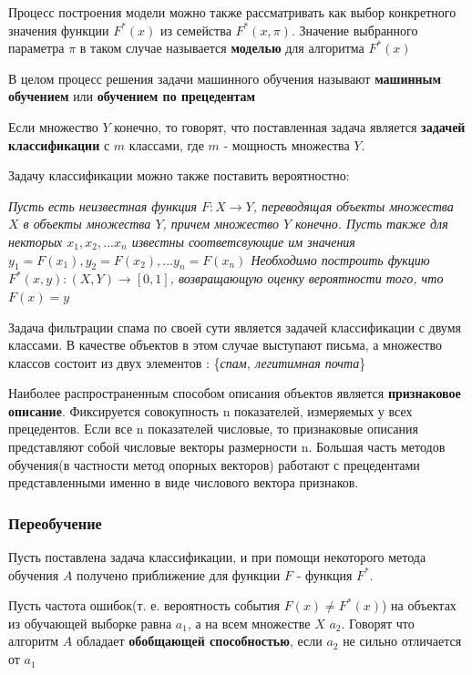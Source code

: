 Процесс построения модели можно также рассматривать как выбор конкретного значения функции $F^*(x)$ из семейства $F^*(x, \pi)$. Значение выбранного параметра $\pi$ в таком случае называется \textbf{моделью} для алгоритма
$F^*(x)$

В целом процесс решения задачи машинного обучения называют \textbf{машинным обучением} или \textbf{обучением по прецедентам}

Если множество $Y$ конечно, то говорят, что поставленная задача  является \textbf{задачей классификации} с $m$ классами, где $m$ - мощность множества $Y$.

Задачу классификации можно также поставить вероятностно:

\textit {
Пусть есть неизвестная функция $F: X \rightarrow Y$, переводящая объекты
множества $X$ в объекты множества $Y$, причем множество $Y$ конечно. Пусть также для некторых $x_1, x_2, ... x_n$ известны соответсвующие им значения $y_1 = F(x_1), y_2 = F(x_2), ... y_n = F(x_n)$ Необходимо построить фукцию $F^*(x, y): (X, Y) \rightarrow [0, 1]$, возвращающую оценку вероятности того, что $F(x)=y$
}

Задача фильтрации спама по своей сути является задачей классификации с двумя классами. В качестве объектов в этом случае выступают письма, а множество классов состоит из двух элементов : \{\textit{спам, легитимная почта}\}

Наиболее распространенным способом описания объектов является \textbf{признаковое описание}. Фиксируется совокупность n показателей, измеряемых у всех прецедентов. Если все n показателей числовые, то признаковые описания представляют собой числовые векторы размерности n. Большая часть методов обучения(в частности метод опорных векторов) работают с прецедентами представленными именно в виде числового вектора признаков.


\subsubsection{Переобучение}
\label{overfitting}
Пусть поставлена задача классификации, и при помощи некоторого метода обучения $A$ получено приближение для функции $F$ - функция $F^*$. 

Пусть частота ошибок(т. е. вероятность события $F(x) \neq F^*(x)$) на объектах из обучающей выборке равна $a_1$, а на всем множестве $X$ $a_2$. Говорят что алгоритм $A$ обладает \textbf{обобщающей способностью}, если $a_2$ не сильно отличается от $a_1$

